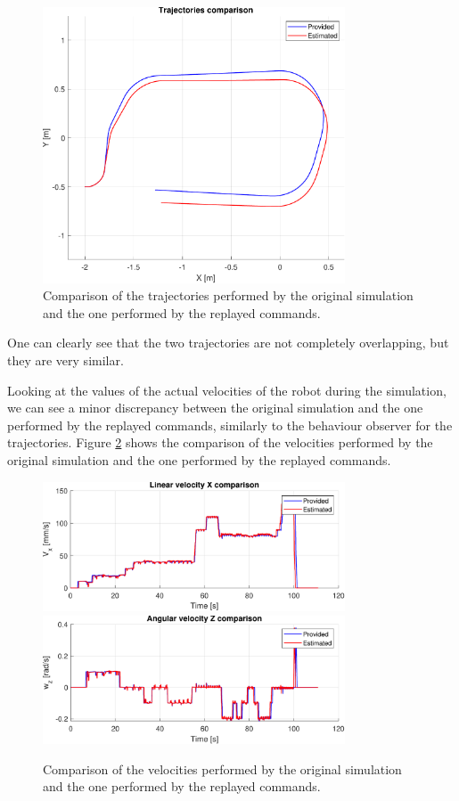 \begin{figure}[H]
    \centering
    \includegraphics[width=0.8\textwidth]{./img/MATLAB/trajectories_comparison.pdf}
    \caption{Comparison of the trajectories performed by the original simulation and the one performed by the replayed commands.}
    \label{fig:trajectory_comparison}
\end{figure}

One can clearly see that the two trajectories are not completely overlapping, but they are very similar.

Looking at the values of the actual velocities of the robot during the simulation, we can see a minor discrepancy between the original simulation and the one performed by the replayed commands, similarly to the behaviour observer for the trajectories.
Figure \ref{fig:velocity_comparison} shows the comparison of the velocities performed by the original simulation and the one performed by the replayed commands.

\begin{figure}[H]
    \centering
    \includegraphics[width=0.8\textwidth]{./img/MATLAB/linear_velocity_comparison.pdf}
    \includegraphics[width=0.8\textwidth]{./img/MATLAB/angular_velocity_comparison.pdf}
    \caption{Comparison of the velocities performed by the original simulation and the one performed by the replayed commands.}
    \label{fig:velocity_comparison}
\end{figure}

